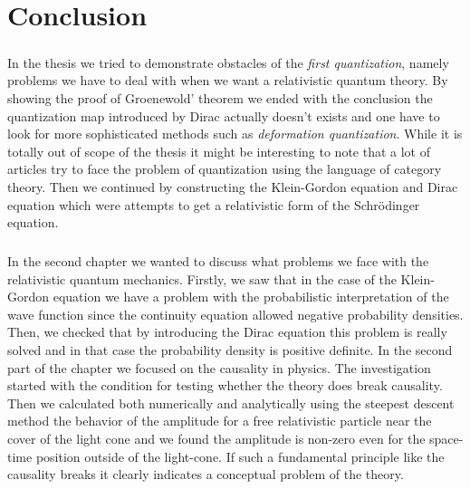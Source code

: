 \chapter*{Conclusion}

\paragraph{} In the thesis we tried to demonstrate obstacles of the \textit{first quantization}, namely
problems we have to deal with when we want a relativistic quantum theory. By showing the proof of Groenewold' theorem
we ended with the conclusion the quantization map introduced by Dirac actually doesn't exists and one have
to look for more sophisticated methods such as \textit{deformation quantization}. While it is totally out of scope 
of the thesis it might be interesting to note that a lot of articles try to face the problem of quantization using
the language of category theory. Then we continued by constructing the Klein-Gordon equation and Dirac equation
which were attempts to get a relativistic form of the Schrödinger equation.

\paragraph{} In the second chapter we wanted to discuss what problems we face with the relativistic quantum mechanics.
Firstly, we saw that in the case of the Klein-Gordon equation we have a problem with the probabilistic 
interpretation of the wave function since the continuity equation allowed negative probability densities.
Then, we checked that by introducing the Dirac equation this problem is really solved and in that case 
the probability density is positive definite. In the second part of the chapter we focused on the
causality in physics. The investigation started with the condition for testing whether the theory does
break causality. Then we calculated both numerically and analytically using the steepest descent method
the behavior of the amplitude for a free relativistic particle near the cover of the light cone and we
found the amplitude is non-zero even for the space-time position outside of the light-cone. If such a fundamental
principle like the causality breaks it clearly indicates a conceptual problem of the theory.

